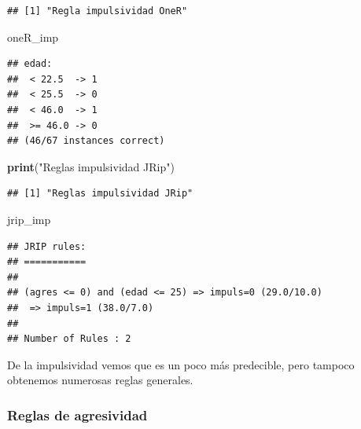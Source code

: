 \documentclass[]{article}
\newenvironment{Shaded}{\begin{snugshade}}{\end{snugshade}}
\newcommand{\KeywordTok}[1]{\textcolor[rgb]{0.13,0.29,0.53}{\textbf{#1}}}
\newcommand{\StringTok}[1]{\textcolor[rgb]{0.31,0.60,0.02}{#1}}
\newcommand{\NormalTok}[1]{#1}
\begin{document}
\begin{verbatim}
## [1] "Regla impulsividad OneR"
\end{verbatim}

\begin{Shaded}
\begin{Highlighting}[]
\NormalTok{oneR_imp}
\end{Highlighting}
\end{Shaded}

\begin{verbatim}
## edad:
##  < 22.5  -> 1
##  < 25.5  -> 0
##  < 46.0  -> 1
##  >= 46.0 -> 0
## (46/67 instances correct)
\end{verbatim}

\begin{Shaded}
\begin{Highlighting}[]
\KeywordTok{print}\NormalTok{(}\StringTok{"Reglas impulsividad JRip"}\NormalTok{)}
\end{Highlighting}
\end{Shaded}

\begin{verbatim}
## [1] "Reglas impulsividad JRip"
\end{verbatim}

\begin{Shaded}
\begin{Highlighting}[]
\NormalTok{jrip_imp}
\end{Highlighting}
\end{Shaded}

\begin{verbatim}
## JRIP rules:
## ===========
## 
## (agres <= 0) and (edad <= 25) => impuls=0 (29.0/10.0)
##  => impuls=1 (38.0/7.0)
## 
## Number of Rules : 2
\end{verbatim}

De la impulsividad vemos que es un poco más predecible, pero tampoco
obtenemos numerosas reglas generales.

\subsubsection{Reglas de agresividad}\label{reglas-de-agresividad}
\end{document}

